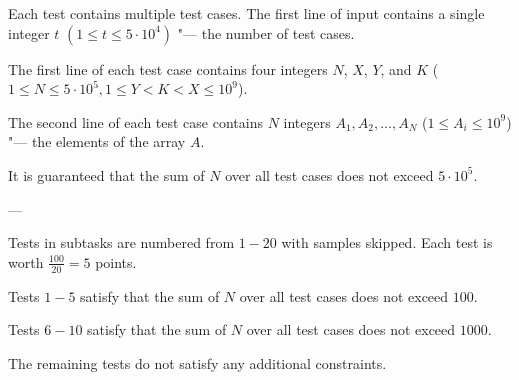 Each test contains multiple test cases. The first line of input contains a single integer $t$ $(1 \leq t \leq 5 \cdot 10^4)$ "--- the number of test cases.

The first line of each test case contains four integers $N$, $X$, $Y$, and $K$ ($1 \le N \le 5 \cdot 10^5, 1 \le Y < K < X \le 10^9$).

The second line of each test case contains $N$ integers $A_1,A_2,\ldots,A_N$ ($1 \le A_i \le 10^9$) "--- the elements of the array $A$.

It is guaranteed that the sum of $N$ over all test cases does not exceed $5 \cdot 10^5$.

---

Tests in subtasks are numbered from $1-20$ with samples skipped. Each test is worth $\frac{100}{20}=5$ points.

Tests $1-5$ satisfy that the sum of $N$ over all test cases does not exceed $100$.

Tests $6-10$ satisfy that the sum of $N$ over all test cases does not exceed $1000$.

The remaining tests do not satisfy any additional constraints.

